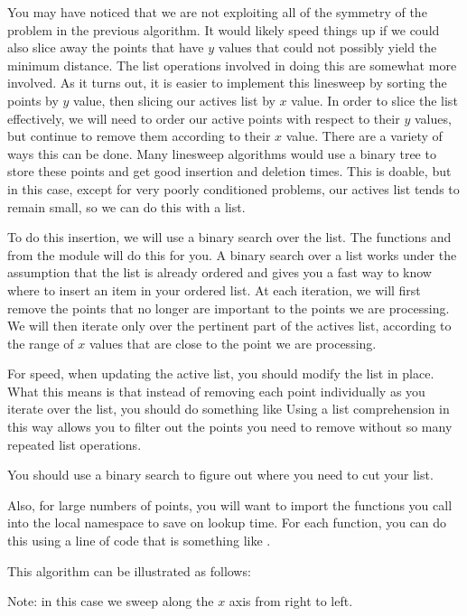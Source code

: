 You may have noticed that we are not exploiting all of the symmetry of the problem in the previous algorithm. 
It would likely speed things up if we could also slice away the points that have $y$ values that could not possibly yield the minimum distance. 
The list operations involved in doing this are somewhat more involved. 
As it turns out, it is easier to implement this linesweep by sorting the points by $y$ value, then slicing our actives list by $x$ value.
In order to slice the list effectively, we will need to order our active points with respect to their $y$ values, but continue to remove them according to their $x$ value. 
There are a variety of ways this can be done. 
Many linesweep algorithms would use a binary tree to store these points and get good insertion and deletion times. 
This is doable, but in this case, except for very poorly conditioned problems, our actives list tends to remain small, so we can do this with a list. 

To do this insertion, we will use a binary search over the list. 
The functions  and  from the  module will do this for you. 
A binary search over a list works under the assumption that the list is already ordered and gives you a fast way to know where to insert an item in your ordered list. 
At each iteration, we will first remove the points that no longer are important to the points we are processing. 
We will then iterate only over the pertinent part of the actives list, according to the range of $x$ values that are close to the point we are processing.

For speed, when updating the active list, you should modify the list in place. 
What this means is that instead of removing each point individually as you iterate over the list, you should do something like  
Using a list comprehension in this way allows you to filter out the points you need to remove without so many repeated list operations. 

You should use a binary search to figure out where you need to cut your list. 

Also, for large numbers of points, you will want to import the functions you call into the local namespace to save on lookup time. 
For each function, you can do this using a line of code that is something like . 

This algorithm can be illustrated as follows:

Note: in this case we sweep along the $x$ axis from right to left.


